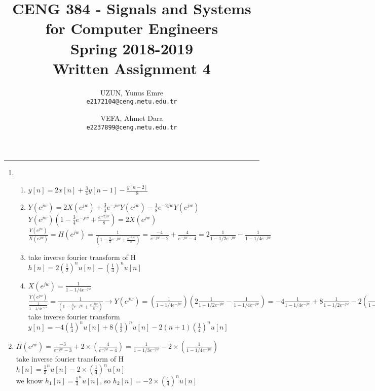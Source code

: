 \documentclass[10pt,a4paper, margin=1in]{article}
\author{
  UZUN, Yunus Emre\\
  \texttt{e2172104@ceng.metu.edu.tr}
  \and
  VEFA, Ahmet Dara\\
  \texttt{e2237899@ceng.metu.edu.tr}
}
\title{CENG 384 - Signals and Systems for Computer Engineers \\
Spring 2018-2019 \\
Written Assignment 4}
\begin{document}
\maketitle



\noindent\rule{19cm}{1.2pt}

\begin{enumerate}

\item 
    \begin{enumerate}
    \item %
    $y[n]=2x[n]+\frac{3}{4}y[n-1]-\frac{y[n-2]}{8} $
    \item %
    $Y(e^{jw})=2X(e^{jw})+\frac{3}{4}e^{-jw}Y(e^{jw})-\frac{1}{8}e^{-2jw}Y(e^{jw}) $\\
    $Y(e^{jw})(1-\frac{3}{4}e^{-jw}+\frac{e^{-2jw}}{8})=2X(e^{jw}) $\\
    $\frac{Y(e^{jw})}{X(e^{jw})}=H(e^{jw})= \frac{1}{(1-\frac{3}{4}e^{-jw}+\frac{e^{-2jw}}{8})}=\frac{-4}{e^{-jw}-2}+\frac{4}{e^{-jw}-4}=2\frac{1}{1-1/2e^{-jw}}-\frac{1}{1-1/4e^{-jw}} $
    \item %
    take inverse fourier transform of H \\
    $h[n]=2(\frac{1}{2})^nu[n]-(\frac{1}{4})^nu[n]$
    
    \item %
    $X(e^{jw})=\frac{1}{1-1/4e^{-jw}}$\\
    $\frac{Y(e^{jw})}{\frac{1}{1-1/4e^{-jw}}}=\frac{1}{(1-\frac{3}{4}e^{-jw}+\frac{e^{-2jw}}{8})}\xrightarrow{}Y(e^{jw})=(\frac{1}{1-1/4e^{-jw}})(2\frac{1}{1-1/2e^{-jw}}-\frac{1}{1-1/4e^{-jw}})=-4\frac{1}{1-1/4e^{-jw}}+8\frac{1}{1-1/2e^{-jw}}-2(\frac{1}{1-1/4e^{-jw}})^2$\\
    take inverse fourier transform\\
    $y[n]=-4(\frac{1}{4})^nu[n]+8(\frac{1}{2})^nu[n]-2(n+1)(\frac{1}{4})^nu[n]$
    \end{enumerate}


\item %
$ H(e^{jw})= \frac{-3}{e^{-jw}-3}+2\times(\frac{4}{e^{-jw}-4})=\frac{1}{1-1/3e^{-jw}}-2\times(\frac{1}{1-1/4e^{-jw}}) $\\
take inverse fourier transform of H\\
$h[n]=\frac{1}{3}^nu[n]-2\times(\frac{1}{4})^nu[n]$\\
we know $h_1[n]=\frac{1}{3}^nu[n]$, so $h_2[n]=-2\times(\frac{1}{4})^nu[n]$


\end{enumerate}
\end{document}
